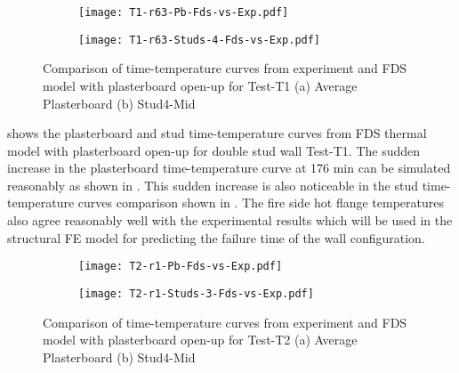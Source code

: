 \begin{figure}[!htbp]
	\centering
	\begin{subfigure}[b]{0.6\textwidth}
		\centering
		\texttt{[image: T1-r63-Pb-Fds-vs-Exp.pdf]}
		\caption{}
		\label{subfig:T1-r63-Pb-Fds-vs-Exp-pbop}
	\end{subfigure}
	\begin{subfigure}[b]{0.6\textwidth}
		\centering
		\texttt{[image: T1-r63-Studs-4-Fds-vs-Exp.pdf]}
		\caption{}
		\label{subfig:T1-r63-Studs-4-Fds-vs-Exp-pbop}
	\end{subfigure}
	   \caption{Comparison of time-temperature curves from experiment and FDS model with plasterboard open-up for Test-T1 (a) Average Plasterboard (b) Stud4-Mid}
	   \label{fig:T1-fds-output-pbop}
\end{figure}

 shows the plasterboard and stud time-temperature curves from FDS thermal model with plasterboard open-up for double stud wall Test-T1. The sudden increase in the plasterboard time-temperature curve at 176 min can be simulated reasonably as shown in . This sudden increase is also noticeable in the stud time-temperature curves comparison shown in . The fire side hot flange temperatures also agree reasonably well with the experimental results which will be used in the structural FE model for predicting the failure time of the wall configuration.

\begin{figure}[!htbp]
	\centering
	\begin{subfigure}[b]{0.7\textwidth}
		\centering
		\texttt{[image: T2-r1-Pb-Fds-vs-Exp.pdf]}
		\caption{}
		\label{subfig:T2-r1-Pb-Fds-vs-Exp-pbop}
	\end{subfigure}
	\begin{subfigure}[b]{0.6\textwidth}
		\centering
		\texttt{[image: T2-r1-Studs-3-Fds-vs-Exp.pdf]}
		\caption{}
		\label{subfig:T2-r1-Studs-3-Fds-vs-Exp-pbop}
	\end{subfigure}
	   \caption{Comparison of time-temperature curves from experiment and FDS model with plasterboard open-up for Test-T2 (a) Average Plasterboard (b) Stud4-Mid}
	   \label{fig:T2-fds-output-pbop}
\end{figure}

